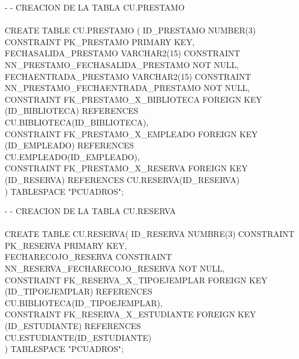 \documentclass[12pt,letterpaper]{article}
\begin{document}
	\normalsize
	- - CREACION DE LA TABLA CU.PRESTAMO\\\\
	\small
	CREATE TABLE CU.PRESTAMO (
	ID\_PRESTAMO NUMBER(3) CONSTRAINT PK\_PRESTAMO PRIMARY KEY,\\
	FECHASALIDA\_PRESTAMO VARCHAR2(15) CONSTRAINT NN\_PRESTAMO\_FECHASALIDA\_PRESTAMO NOT NULL,\\
	FECHAENTRADA\_PRESTAMO VARCHAR2(15) CONSTRAINT NN\_PRESTAMO\_FECHAENTRADA\newline \_PRESTAMO NOT NULL,\\
	CONSTRAINT FK\_PRESTAMO\_X\_BIBLIOTECA FOREIGN KEY (ID\_BIBLIOTECA) REFERENCES \\ CU.BIBLIOTECA(ID\_BIBLIOTECA),\\
	CONSTRAINT FK\_PRESTAMO\_X\_EMPLEADO FOREIGN KEY (ID\_EMPLEADO) REFERENCES  \\ CU.EMPLEADO(ID\_EMPLEADO),\\
	CONSTRAINT FK\_PRESTAMO\_X\_RESERVA FOREIGN KEY (ID\_RESERVA) REFERENCES CU.RESER\newline VA(ID\_RESERVA)\\
	) TABLESPACE "PCUADROS";

	\vspace{\baselineskip}
\normalsize
	- - CREACION DE LA TABLA CU.RESERVA\\\\
	\small
	CREATE TABLE CU.RESERVA(
	ID\_RESERVA NUMBRE(3) CONSTRAINT PK\_RESERVA PRIMARY KEY,\\
	FECHARECOJO\_RESERVA CONSTRAINT NN\_RESERVA\_FECHARECOJO\_RESERVA NOT NULL,\\
	CONSTRAINT FK\_RESERVA\_X\_TIPOEJEMPLAR FOREIGN KEY (ID\_TIPOEJEMPLAR) REFERENCES \\ CU.BIBLIOTECA(ID\_TIPOEJEMPLAR),\\
	CONSTRAINT FK\_RESERVA\_X\_ESTUDIANTE FOREIGN KEY (ID\_ESTUDIANTE) REFERENCES \\   CU.ESTUDIANTE(ID\_ESTUDIANTE)\\
	) TABLESPACE "PCUADROS";\\\\

	\vspace{\baselineskip}

	
\end{document}
